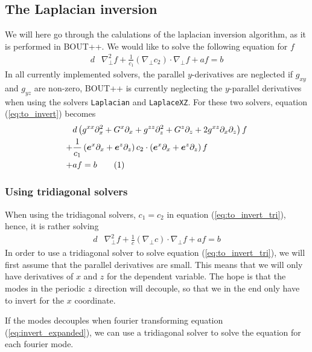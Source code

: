 \documentclass[12pt]{article}
\def\L{\left}
\def\R{\right}
\newcommand{\Grad}{\ensuremath{\nabla}}
\newcommand{\ve}[1]{\ensuremath{\boldsymbol{#1}}}
\newcommand\numberthis{\addtocounter{equation}{1}\tag{\theequation}}
\begin{document}
\subsection{The Laplacian inversion}
%
We will here go through the calulations of the laplacian inversion algorithm,
as it is performed in BOUT++. We would like to solve the following equation for
$f$
%
\begin{align}
    d&\Grad_\perp^2f + \frac{1}{c_1}(\Grad_\perp c_2)\cdot\Grad_\perp f + af =
    b
    \label{eq:to_invert}
\end{align}
%
In all currently implemented solvers, the parallel $y$-derivatives are
neglected if $g_{xy}$ and $g_{yz}$ are non-zero, BOUT++ is currently neglecting
the $y$-parallel derivatives when using the solvers \texttt{Laplacian} and
\texttt{LaplaceXZ}.  For these two solvers, equation (\ref{eq:to_invert})
becomes
%
\begin{align*}
    \, &d \L(    g^{xx} \partial_x^2 + G^x \partial_x + g^{zz} \partial_z^2 +
    G^z \partial_z + 2g^{xz} \partial_x \partial_z \R) f \\
%
    +& \frac{1}{c_1}\L( \ve{e}^x \partial_x +  \ve{e}^z \partial_z \R) c_2
    \cdot \L( \ve{e}^x \partial_x +  \ve{e}^z \partial_z \R) f \\
%
    +& af = b \numberthis
    \label{eq:invert_expanded}
\end{align*}
%


\subsubsection{Using tridiagonal solvers}
%
When using the tridiagonal solvers, $c_1 = c_2$ in equation
(\ref{eq:to_invert_tri}), hence, it is rather solving
%
\begin{align}
    d&\Grad_\perp^2f + \frac{1}{c}(\Grad_\perp c)\cdot\Grad_\perp f + af = b
    \label{eq:to_invert_tri}
\end{align}
%
In order to use a tridiagonal solver to solve equation
(\ref{eq:to_invert_tri}), we will first assume that the parallel derivatives
are small. This means that we will only have derivatives of $x$ and $z$ for the
dependent variable. The hope is that the modes in the periodic $z$ direction
will decouple, so that we in the end only have to invert for the $x$
coordinate.

If the modes decouples when fourier transforming equation
(\ref{eq:invert_expanded}), we can use a tridiagonal solver to solve the
equation for each fourier mode.
\end{document}
